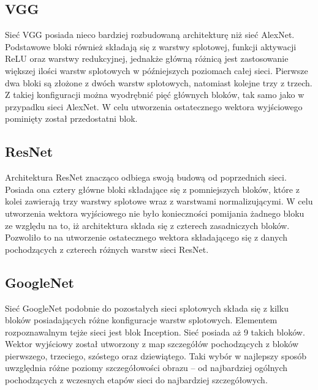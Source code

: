 \subsection{VGG}
Sieć VGG \cite{vggnet} posiada nieco bardziej rozbudowaną architekturę niż sieć AlexNet. Podstawowe bloki również składają się z warstwy splotowej, funkcji aktywacji ReLU oraz warstwy redukcyjnej, jednakże główną różnicą jest zastosowanie większej ilości warstw splotowych w późniejszych poziomach całej sieci. Pierwsze dwa bloki są złożone z dwóch warstw splotowych, natomiast kolejne trzy z trzech. Z takiej konfiguracji można wyodrębnić pięć głównych bloków, tak samo jako w przypadku sieci AlexNet. W celu utworzenia ostatecznego wektora wyjściowego pominięty został przedostatni blok.
\subsection{ResNet}
Architektura ResNet \cite{resnet} znacząco odbiega swoją budową od poprzednich sieci. Posiada ona cztery główne bloki składające się z pomniejszych bloków, które z kolei zawierają trzy warstwy splotowe wraz z warstwami normalizującymi. W celu utworzenia wektora wyjściowego nie było konieczności pomijania żadnego bloku ze względu na to, iż architektura składa się z czterech zasadniczych bloków. Pozwoliło to na utworzenie ostatecznego wektora składającego się z danych pochodzących z czterech różnych warstw sieci ResNet.
\subsection{GoogleNet}
Sieć GoogleNet \cite{googlenet} podobnie do pozostałych sieci splotowych składa się z kilku bloków posiadających różne konfiguracje warstw splotowych. Elementem rozpoznawalnym tejże sieci jest blok Inception. Sieć posiada aż 9 takich bloków. Wektor wyjściowy został utworzony z map szczegółów pochodzących z bloków pierwszego, trzeciego, szóstego oraz dziewiątego. Taki wybór w najlepszy sposób uwzględnia różne poziomy szczegółowości obrazu -- od najbardziej ogólnych pochodzących z wczesnych etapów sieci do najbardziej szczegółowych.
